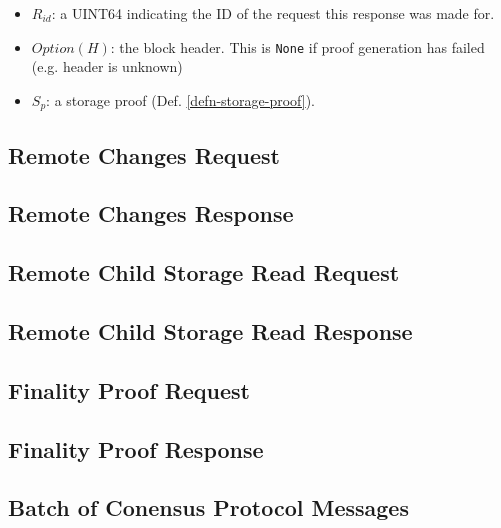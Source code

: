 \documentclass{book}
\begin{document}
\begin{itemize}
    \item $R_{id}$: a UINT64 indicating the ID of the request this response was
    made for.
    \item $Option(H)$: the block header. This is \verb|None| if proof generation
    has failed (e.g. header is unknown)
    \item $S_p$: a storage proof (Def. \ref{defn-storage-proof}).
\end{itemize}

\subsection{Remote Changes Request}

\subsection{Remote Changes Response}

\subsection{Remote Child Storage Read Request}

\subsection{Remote Child Storage Read Response}

\subsection{Finality Proof Request}

\subsection{Finality Proof Response}

\subsection{Batch of Conensus Protocol Messages}
\end{document}
